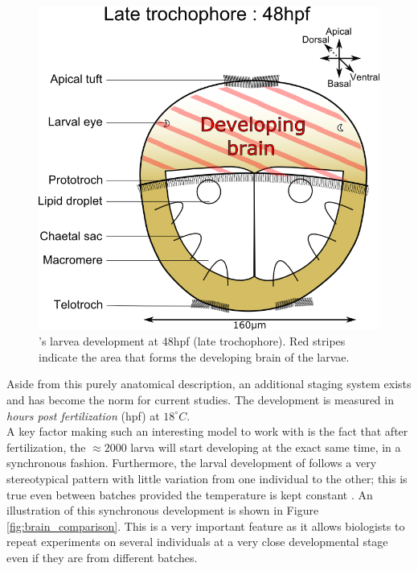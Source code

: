 \begin{figure}[bth]
\begin{center}
  \includegraphics[width=\linewidth]{gfx/chapter1/larvae48hpf.png}
\end{center}
  \caption{\platyfull{}'s larvea development at 48hpf (late trochophore). Red stripes indicate the area that forms the developing brain of the larvae.}
  \label{fig:platynereis_larvae_scheme}
\end{figure}
    
    Aside from this purely anatomical description, an additional staging system exists and has become the norm for current studies. The development is measured in \textit{hours post fertilization} (hpf) at $18^{\circ}C$.\\
    
    A key factor making \platy{} such an interesting model to work with is the fact that after fertilization, the $\approx 2000$ larva will start developing at the exact same time, in a synchronous fashion. Furthermore, the larval development of \platy{} follows a very stereotypical pattern with little variation from one individual to the other; this is true even between batches provided the temperature is kept constant \citep{fischer04,dorresteijn90}. An illustration of this synchronous development is shown in Figure \ref{fig:brain_comparison}. This is a very important feature as it allows biologists to repeat experiments on several individuals at a very close developmental stage even if they are from different batches.\\
    

